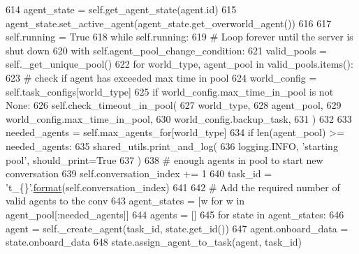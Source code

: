 \begin{DoxyCode}
614                 agent\_state = self.get\_agent\_state(agent.id)
615                 agent\_state.set\_active\_agent(agent\_state.get\_overworld\_agent())
616 
617         self.running = \textcolor{keyword}{True}
618         \textcolor{keywordflow}{while} self.running:
619             \textcolor{comment}{# Loop forever until the server is shut down}
620             with self.agent\_pool\_change\_condition:
621                 valid\_pools = self.\_get\_unique\_pool()
622                 \textcolor{keywordflow}{for} world\_type, agent\_pool \textcolor{keywordflow}{in} valid\_pools.items():
623                     \textcolor{comment}{# check if agent has exceeded max time in pool}
624                     world\_config = self.task\_configs[world\_type]
625                     \textcolor{keywordflow}{if} world\_config.max\_time\_in\_pool \textcolor{keywordflow}{is} \textcolor{keywordflow}{not} \textcolor{keywordtype}{None}:
626                         self.check\_timeout\_in\_pool(
627                             world\_type,
628                             agent\_pool,
629                             world\_config.max\_time\_in\_pool,
630                             world\_config.backup\_task,
631                         )
632 
633                     needed\_agents = self.max\_agents\_for[world\_type]
634                     \textcolor{keywordflow}{if} len(agent\_pool) >= needed\_agents:
635                         shared\_utils.print\_and\_log(
636                             logging.INFO, \textcolor{stringliteral}{'starting pool'}, should\_print=\textcolor{keyword}{True}
637                         )
638                         \textcolor{comment}{# enough agents in pool to start new conversation}
639                         self.conversation\_index += 1
640                         task\_id = \textcolor{stringliteral}{'t\_\{\}'}.\hyperlink{namespaceparlai_1_1chat__service_1_1services_1_1messenger_1_1shared__utils_a32e2e2022b824fbaf80c747160b52a76}{format}(self.conversation\_index)
641 
642                         \textcolor{comment}{# Add the required number of valid agents to the conv}
643                         agent\_states = [w \textcolor{keywordflow}{for} w \textcolor{keywordflow}{in} agent\_pool[:needed\_agents]]
644                         agents = []
645                         \textcolor{keywordflow}{for} state \textcolor{keywordflow}{in} agent\_states:
646                             agent = self.\_create\_agent(task\_id, state.get\_id())
647                             agent.onboard\_data = state.onboard\_data
648                             state.assign\_agent\_to\_task(agent, task\_id)

\end{DoxyCode}

